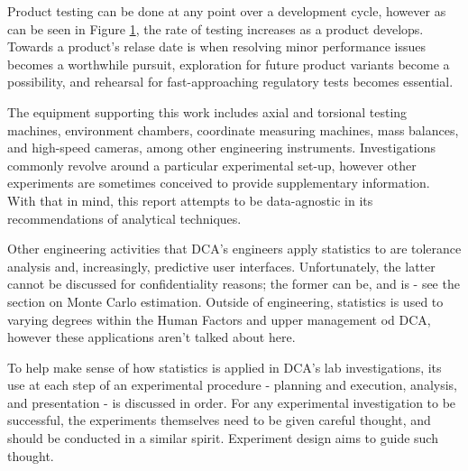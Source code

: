 \documentclass[11pt,a4paper,article]{memoir} %
\begin{document}
\par
Product testing can be done at any point over a development cycle, however as can be seen in Figure \ref{fig:time_of_tests}, the rate of testing increases as a product develops. Towards a product's relase date is when resolving minor performance issues becomes a worthwhile pursuit, exploration for future product variants become a possibility, and rehearsal for fast-approaching regulatory tests becomes essential.
\begin{figure}
\label{fig:time_of_tests}
\end{figure}
\par
The equipment supporting this work includes axial and torsional testing machines, environment chambers, coordinate measuring machines, mass balances, and high-speed cameras, among other engineering instruments. Investigations commonly revolve around a particular experimental set-up, however other experiments are sometimes conceived to provide supplementary information. With that in mind, this report attempts to be data-agnostic in its recommendations of analytical techniques.
\par
Other engineering activities that DCA's engineers apply statistics to are tolerance analysis and, increasingly, predictive user interfaces. Unfortunately, the latter cannot be discussed for confidentiality reasons; the former can be, and is - see the section on Monte Carlo estimation. Outside of engineering, statistics is used to varying degrees within the Human Factors and upper management od DCA, however these applications aren't talked about here.
\par
To help make sense of how statistics is applied in DCA's lab investigations, its use at each step of an experimental procedure - planning and execution, analysis, and presentation - is discussed in order. For any experimental investigation to be successful, the experiments themselves need to be given careful thought, and should be conducted in a similar spirit. Experiment design aims to guide such thought.

\end{document}
